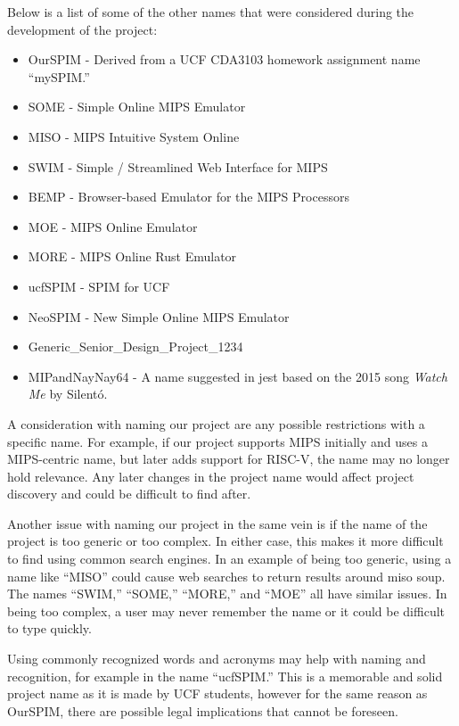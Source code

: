 \documentclass[
    paper=letter,
    parskip=half,
    fontsize=12pt,
    titlepage=firstiscover,
    toc=bibliography,
    numbers=endperiod
]{scrartcl}
\providecommand{\tightlist}{%
  \setlength{\itemsep}{0pt}\setlength{\parskip}{0pt}}
\begin{document}
Below is a list of some of the other names that were considered during
the development of the project:

\begin{itemize}
    \tightlist
    \item OurSPIM - Derived from a UCF CDA3103 homework assignment name
          ``mySPIM.''
    \item SOME - Simple Online MIPS Emulator
    \item MISO - MIPS Intuitive System Online
    \item SWIM - Simple / Streamlined Web Interface for MIPS
    \item BEMP - Browser-based Emulator for the MIPS Processors
    \item MOE - MIPS Online Emulator
    \item MORE - MIPS Online Rust Emulator
    \item ucfSPIM - SPIM for UCF
    \item NeoSPIM - New Simple Online MIPS Emulator
    \item Generic\_Senior\_Design\_Project\_1234
    \item MIPandNayNay64 - A name suggested in jest based on the 2015 song
          \emph{Watch Me} by Silent\'o.
\end{itemize}

A consideration with naming our project are any possible restrictions
with a specific name. For example, if our project supports MIPS
initially and uses a MIPS-centric name, but later adds support for
RISC-V, the name may no longer hold relevance. Any later changes in the
project name would affect project discovery and could be difficult to
find after.

Another issue with naming our project in the same vein is if the name of
the project is too generic or too complex. In either case, this makes it
more difficult to find using common search engines. In an example of
being too generic, using a name like ``MISO'' could cause web searches
to return results around miso soup. The names ``SWIM,'' ``SOME,''
``MORE,'' and ``MOE'' all have similar issues. In being too complex, a
user may never remember the name or it could be difficult to type
quickly.

Using commonly recognized words and acronyms may help with naming and
recognition, for example in the name ``ucfSPIM.'' This is a memorable
and solid project name as it is made by UCF students, however for the
same reason as OurSPIM, there are possible legal implications that
cannot be foreseen.
\end{document}
